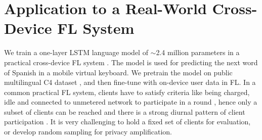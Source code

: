 \documentclass{article}
\begin{document}
\section{Application to a Real-World Cross-Device FL System}\label{sec:production-detail}
We train a one-layer LSTM language model of $\sim$2.4 million parameters in a practical cross-device FL system %
. 
The model is used for predicting the next word of Spanish in a mobile virtual keyboard. We pretrain the model on public multilingual C4 dataset \citep{raffel2020t5,xue2020mt5}, and then fine-tune with on-device user data in FL. In a common practical FL system, clients have to satisfy criteria like being charged, idle and connected to unmetered network to participate in a round \citep{NWP18,bonawitz2019towards,paulik2021federated,huba2022papaya}, hence only a subset of clients can be reached and there is a strong diurnal pattern of client participation \citep{yang2018applied,zhu2022diurnal}. It is very challenging to hold a fixed set of clients for evaluation, or develop random sampling for privacy amplification.
\end{document}
